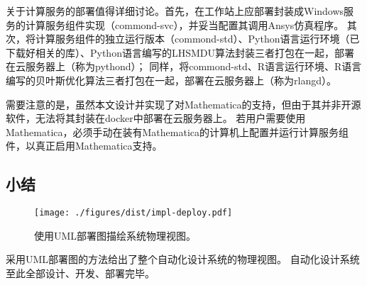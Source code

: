 \documentclass[index]{subfiles}
\begin{document}
关于计算服务的部署值得详细讨论。首先，在工作站上应部署封装成Windows服务的计算服务组件实现（commond-svc），并妥当配置其调用Ansys仿真程序。
其次，将计算服务组件的独立运行版本（commond-std）、Python语言运行环境（已下载好相关的库）、Python语言编写的LHSMDU算法封装三者打包在一起，部署在云服务器上（称为pythond）；
同样，将commond-std、R语言运行环境、R语言编写的贝叶斯优化算法三者打包在一起，部署在云服务器上（称为rlangd）。

需要注意的是，虽然本文设计并实现了对Mathematica的支持，但由于其并非开源软件，无法将其封装在docker中部署在云服务器上。
若用户需要使用Mathematica，必须手动在装有Mathematica的计算机上配置并运行计算服务组件，以真正启用Mathematica支持。

\subsection{小结}
\begin{figure}[h]
  \centering
  \texttt{[image: ./figures/dist/impl-deploy.pdf]}
  \caption[系统物理视图]{使用UML部署图描绘系统物理视图。\label{fig:impl-deploy}}
\end{figure}
采用UML部署图的方法给出了整个自动化设计系统的物理视图。
自动化设计系统至此全部设计、开发、部署完毕。
\end{document}
